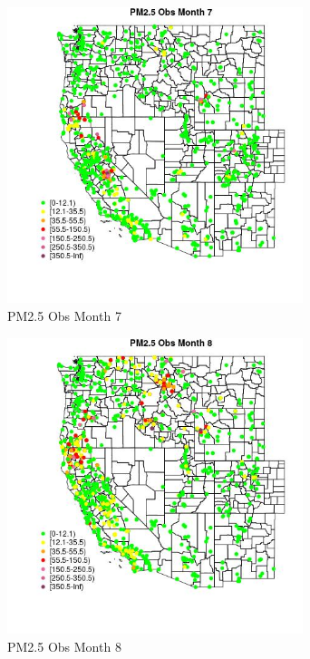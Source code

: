 \begin{figure} 
\centering  
\includegraphics[width=0.77\textwidth]{Code_Outputs/Report_ML_input_PM25_Step4_part_f_de_duplicated_aves_prioritize_24hr_obswNAs_MapObsMo7PM25_Obs.jpg} 
\caption{\label{fig:Report_ML_input_PM25_Step4_part_f_de_duplicated_aves_prioritize_24hr_obswNAsMapObsMo7PM25_Obs}PM2.5 Obs Month 7} 
\end{figure} 
 

\begin{figure} 
\centering  
\includegraphics[width=0.77\textwidth]{Code_Outputs/Report_ML_input_PM25_Step4_part_f_de_duplicated_aves_prioritize_24hr_obswNAs_MapObsMo8PM25_Obs.jpg} 
\caption{\label{fig:Report_ML_input_PM25_Step4_part_f_de_duplicated_aves_prioritize_24hr_obswNAsMapObsMo8PM25_Obs}PM2.5 Obs Month 8} 
\end{figure} 
 


